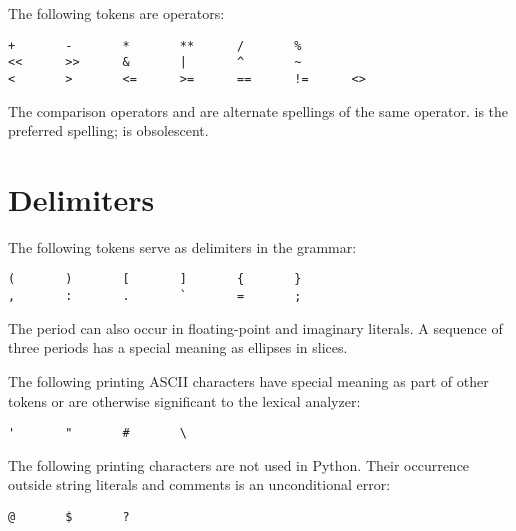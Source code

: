 The following tokens are operators:

\begin{verbatim}
+       -       *       **      /       %
<<      >>      &       |       ^       ~
<       >       <=      >=      ==      !=      <>
\end{verbatim}

The comparison operators \code{<>} and \code{!=} are alternate
spellings of the same operator.  \code{!=} is the preferred spelling;
\code{<>} is obsolescent.

\section{Delimiters}

The following tokens serve as delimiters in the grammar:

\begin{verbatim}
(       )       [       ]       {       }
,       :       .       `       =       ;
\end{verbatim}

The period can also occur in floating-point and imaginary literals.  A
sequence of three periods has a special meaning as ellipses in slices.

The following printing ASCII characters have special meaning as part
of other tokens or are otherwise significant to the lexical analyzer:

\begin{verbatim}
'       "       #       \
\end{verbatim}

The following printing \ASCII{} characters are not used in Python.  Their
occurrence outside string literals and comments is an unconditional
error:

\begin{verbatim}
@       $       ?
\end{verbatim}
